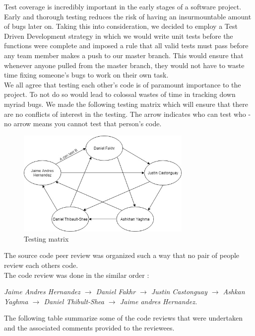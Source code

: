 \documentclass[a4paper, 12pt]{article}
\begin{document}
Test coverage is incredibly important in the early stages of a software project. Early and thorough testing reduces the risk of having an insurmountable amount of bugs later on. Taking this into consideration, we decided to employ a Test Driven Development strategy in which we would write unit tests before the functions were complete and imposed a rule that all valid tests must pass before any team member makes a push to our master branch. This would ensure that whenever anyone pulled from the master branch, they would not have to waste time fixing someone's bugs to work on their own task. \\

We all agree that testing each other's code is of paramount importance to the project. To not do so would lead to colossal wastes of time in tracking down myriad bugs. We made the following testing matrix which will ensure that there are no conflicts of interest in the testing. The arrow indicates who can test who - no arrow means you cannot test that person's code.

\begin{figure}[!h]
\caption{Testing matrix}
\centering
\includegraphics[width=0.75\textwidth]{TestingMatrix}
\end{figure}

The source code peer review was organized such a way that no pair of people review each others code. \\

The code review was done in the similar order :

\medskip
\textit{Jaime Andres Hernandez $\rightarrow$ Daniel Fakhr $\rightarrow$ Justin Castonguay $\rightarrow$ Ashkan Yaghma $\rightarrow$ Daniel Thibult-Shea $\rightarrow$ Jaime andres Hernandez.}
\medskip

The following table summarize some of the code reviews that were undertaken and the associated comments provided to the reviewees.
\end{document}

